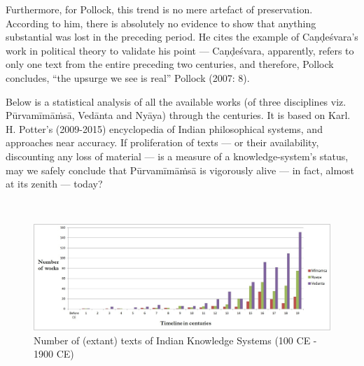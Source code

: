 Furthermore, for Pollock, this trend is no mere artefact of preservation. According to him, there is absolutely no evidence to show that anything substantial was lost in the preceding period. He cites the example of Caṇḍeśvara’s work in political theory to validate his point — Caṇḍeśvara, apparently, refers to only one text from the entire preceding two centuries, and therefore, Pollock concludes, “the upsurge we see is real” Pollock (2007: 8).

Below is a statistical analysis of all the available works (of three disciplines viz. Pūrvamīmāṁsā, Vedānta and Nyāya) through the centuries. It is based on Karl. H. Potter’s (2009-2015) encyclopedia of Indian philosophical systems, and approaches near accuracy. If proliferation of texts — or their availability, discounting any loss of material — is a measure of a knowledge-system’s status, may we safely conclude that Pūrvamīmāṁsā is vigorously alive — in fact, almost at its zenith — today?   

\newpage

\begin{landscape}
~\phantom{a}
\vfill
\begin{figure}[H]
\centering
\includegraphics[scale=1.4]{figures/fig1.jpg}
\caption{Number of (extant) texts of Indian Knowledge Systems (100 CE - 1900 CE)}\label{chap2-fig1}
\end{figure}
\vfill
~\phantom{a}
\end{landscape}

\eject

